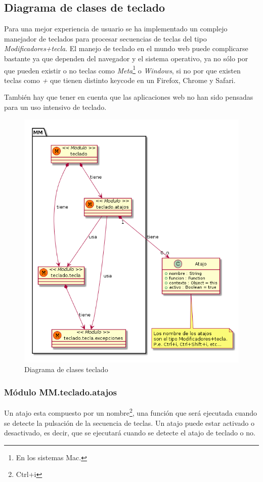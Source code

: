 \subsection{Diagrama de clases de teclado}
Para una mejor experiencia de usuario se ha implementado un complejo manejador de teclados para procesar secuencias de teclas del tipo \textit{Modificadores+tecla}. El manejo de teclado en el mundo web puede complicarse bastante ya que dependen del navegador y el sistema operativo, ya no sólo por que pueden existir o no teclas como \textit{Meta}\footnote{En los sistemas Mac.} o \textit{Windows}, si no por que existen teclas como \textit{+} que tienen distinto keycode en un Firefox, Chrome y Safari.

También hay que tener en cuenta que las aplicaciones web no han sido pensadas para un uso intensivo de teclado.   

\begin{figure}[tbph]
\centering
\includegraphics[width=0.8\linewidth]{imagenes/diagrama-clases-mm-teclado}
\caption{Diagrama de clases teclado}
\label{fig:diagrama-clases-mm-teclado}
\end{figure}


\subsubsection{Módulo MM.teclado.atajos}
Un atajo esta compuesto por un nombre\footnote{Ctrl+i}, una función que será ejecutada cuando se
detecte la pulsación de la secuencia de teclas. Un atajo puede estar activado o desactivado, es
decir, que se ejecutará cuando se detecte el atajo de teclado o no. 

